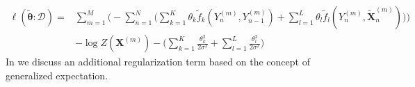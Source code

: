 \begin{equation}
  \label{equ:log-likelihood-linear-chain-crf-log-linear-gaussian}
  \begin{split}
    \ell(\bm{\tilde{\theta}}:\mathcal{D}) = & \sum_{m=1}^M \bigg(-\sum_{n=1}^N \Big(\sum_{k=1}^K\theta_k \tilde{f}_k(Y_n^{(m)},Y_{n-1}^{(m)})+\sum_{l=1}^L\theta_l \tilde{f}_l(Y_n^{(m)},\bm{\tilde{X}}_n^{(m)})\Big)\bigg) \\
    & -\log Z(\bm{X}^{(m)})-\Big(\sum_{k=1}^K\frac{\theta_k^2}{2\sigma^2}+\sum_{l=1}^L\frac{\theta_l^2}{2\sigma^2}\Big)
 \end{split}
\end{equation}
In  we discuss an additional regularization term based on the concept of \gls{generalized expectation}.

\bigskip


